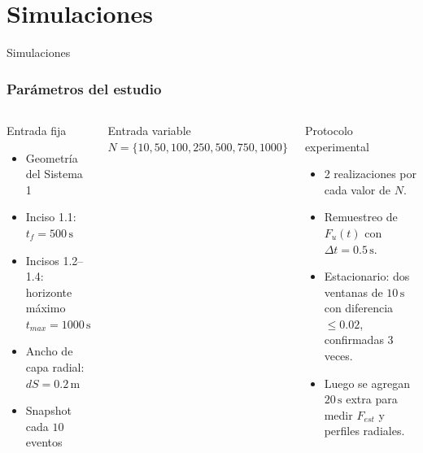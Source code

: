 \documentclass{beamer}
\newcommand{\sectiondivider}[1]{
  \begin{frame}[plain]
    \begin{center}
      \vspace{2.0cm}
      {\color{tpblue}\fontsize{23}{28}\selectfont #1\par}
    \end{center}
  \end{frame}
}
\begin{document}
\section{Simulaciones}
\sectiondivider{Simulaciones}

\begin{frame}
  \frametitle{Par\'ametros del estudio}
  \footnotesize
  \begin{columns}[T,onlytextwidth]
    \begin{block}{Entrada fija}
      \begin{itemize}
        \item Geometr\'ia del Sistema 1
        \item Inciso 1.1: $t_f = 500\,\mathrm{s}$
        \item Incisos 1.2--1.4: horizonte m\'aximo $t_{max} = 1000\,\mathrm{s}$
        \item Ancho de capa radial: $dS = 0.2\,\mathrm{m}$
        \item Snapshot cada $10$ eventos
      \end{itemize}
    \end{block}

    \begin{block}{Entrada variable}
      \centering
      $N = \{10, 50, 100, 250, 500, 750, 1000\}$
    \end{block}

    \begin{block}{Protocolo experimental}
      \begin{itemize}
        \item 2 realizaciones por cada valor de $N$.
        \item Remuestreo de $F_u(t)$ con $\Delta t = 0.5\,\mathrm{s}$.
        \item Estacionario: dos ventanas de $10\,\mathrm{s}$ con diferencia $\le 0.02$, confirmadas 3 veces.
        \item Luego se agregan $20\,\mathrm{s}$ extra para medir $F_{est}$ y perfiles radiales.
      \end{itemize}
    \end{block}
  \end{columns}
\end{frame}
\end{document}
